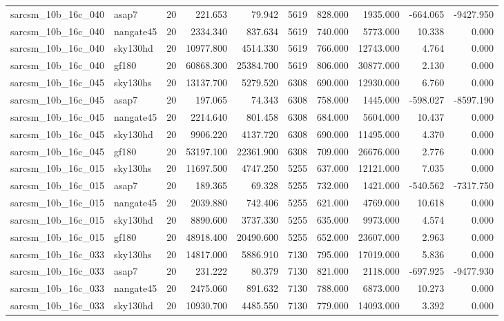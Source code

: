 \begin{longtable}{llrrrrrrrr}
sarcsm\_10b\_16c\_040 & asap7 & 20 & 221.653 & 79.942 & 5619 & 828.000 & 1935.000 & -664.065 & -9427.950 \\
sarcsm\_10b\_16c\_040 & nangate45 & 20 & 2334.340 & 837.634 & 5619 & 740.000 & 5773.000 & 10.338 & 0.000 \\
sarcsm\_10b\_16c\_040 & sky130hd & 20 & 10977.800 & 4514.330 & 5619 & 766.000 & 12743.000 & 4.764 & 0.000 \\
sarcsm\_10b\_16c\_040 & gf180 & 20 & 60868.300 & 25384.700 & 5619 & 806.000 & 30877.000 & 2.130 & 0.000 \\
sarcsm\_10b\_16c\_045 & sky130hs & 20 & 13137.700 & 5279.520 & 6308 & 690.000 & 12930.000 & 6.760 & 0.000 \\
sarcsm\_10b\_16c\_045 & asap7 & 20 & 197.065 & 74.343 & 6308 & 758.000 & 1445.000 & -598.027 & -8597.190 \\
sarcsm\_10b\_16c\_045 & nangate45 & 20 & 2214.640 & 801.458 & 6308 & 684.000 & 5604.000 & 10.437 & 0.000 \\
sarcsm\_10b\_16c\_045 & sky130hd & 20 & 9906.220 & 4137.720 & 6308 & 690.000 & 11495.000 & 4.370 & 0.000 \\
sarcsm\_10b\_16c\_045 & gf180 & 20 & 53197.100 & 22361.900 & 6308 & 709.000 & 26676.000 & 2.776 & 0.000 \\
sarcsm\_10b\_16c\_015 & sky130hs & 20 & 11697.500 & 4747.250 & 5255 & 637.000 & 12121.000 & 7.035 & 0.000 \\
sarcsm\_10b\_16c\_015 & asap7 & 20 & 189.365 & 69.328 & 5255 & 732.000 & 1421.000 & -540.562 & -7317.750 \\
sarcsm\_10b\_16c\_015 & nangate45 & 20 & 2039.880 & 742.406 & 5255 & 621.000 & 4769.000 & 10.618 & 0.000 \\
sarcsm\_10b\_16c\_015 & sky130hd & 20 & 8890.600 & 3737.330 & 5255 & 635.000 & 9973.000 & 4.574 & 0.000 \\
sarcsm\_10b\_16c\_015 & gf180 & 20 & 48918.400 & 20490.600 & 5255 & 652.000 & 23607.000 & 2.963 & 0.000 \\
sarcsm\_10b\_16c\_033 & sky130hs & 20 & 14817.000 & 5886.910 & 7130 & 795.000 & 17019.000 & 5.836 & 0.000 \\
sarcsm\_10b\_16c\_033 & asap7 & 20 & 231.222 & 80.379 & 7130 & 821.000 & 2118.000 & -697.925 & -9477.930 \\
sarcsm\_10b\_16c\_033 & nangate45 & 20 & 2475.060 & 891.632 & 7130 & 788.000 & 6873.000 & 10.273 & 0.000 \\
sarcsm\_10b\_16c\_033 & sky130hd & 20 & 10930.700 & 4485.550 & 7130 & 779.000 & 14093.000 & 3.392 & 0.000 \\

\end{longtable}
